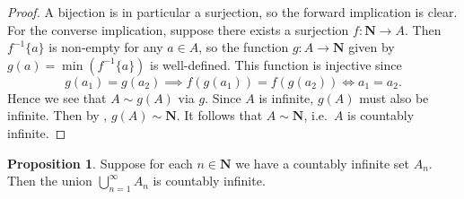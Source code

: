 \documentclass[12pt]{article}
\theoremstyle{definition}
\newtheorem{proposition}[definition]{Proposition}
\newcommand{\N}{\mathbf{N}}
\begin{document}
\begin{proof}
    A bijection is in particular a surjection, so the forward implication is clear. For the converse implication, suppose there exists a surjection \( f : \N \to A \). Then \( f^{-1} \{ a \} \) is non-empty for any \( a \in A \), so the function \( g : A \to \N \) given by \( g(a) = \min( f^{-1} \{ a \} ) \) is well-defined. This function is injective since
    \[
        g(a_1) = g(a_2) \implies f(g(a_1)) = f(g(a_2)) \iff a_1 = a_2.
    \]
    Hence we see that \( A \sim g(A) \) via \( g \). Since \( A \) is infinite, \( g(A) \) must also be infinite. Then by , \( g(A) \sim \N \). It follows that \( A \sim \N \), i.e.\ \( A \) is countably infinite.
\end{proof}

\begin{proposition}
\label{prop:countable_union_of_countable_sets_is_countable}
    Suppose for each \( n \in \N \) we have a countably infinite set \( A_n \). Then the union \( \bigcup_{n=1}^{\infty} A_n \) is countably infinite.
\end{proposition}
\end{document}
